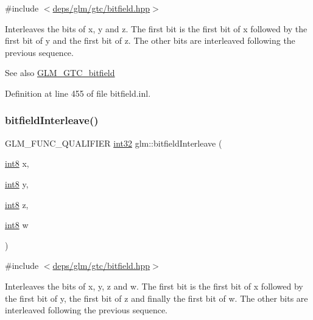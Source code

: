 {\ttfamily \#include $<$\hyperlink{bitfield_8hpp}{deps/glm/gtc/bitfield.\+hpp}$>$}

Interleaves the bits of x, y and z. The first bit is the first bit of x followed by the first bit of y and the first bit of z. The other bits are interleaved following the previous sequence.

\begin{DoxySeeAlso}{See also}
\hyperlink{group__gtc__bitfield}{G\+L\+M\+\_\+\+G\+T\+C\+\_\+bitfield} 
\end{DoxySeeAlso}


Definition at line 455 of file bitfield.\+inl.

\mbox{\label{group__gtc__bitfield_ga7da84ecc2b3a46c9c08a9f40012359cf}} 
\subsubsection{\texorpdfstring{bitfield\+Interleave()}{bitfieldInterleave()}\hspace{0.1cm}{\footnotesize\ttfamily [13/16]}}
{\footnotesize\ttfamily G\+L\+M\+\_\+\+F\+U\+N\+C\+\_\+\+Q\+U\+A\+L\+I\+F\+I\+ER \hyperlink{group__gtc__type__precision_ga632d8b25f6b61659f39ea4321fab92a4}{int32} glm\+::bitfield\+Interleave (\begin{DoxyParamCaption}\item[{\hyperlink{group__gtc__type__precision_ga96254f9c1c4506fc8eb5cf3301ce8565}{int8}}]{x,  }\item[{\hyperlink{group__gtc__type__precision_ga96254f9c1c4506fc8eb5cf3301ce8565}{int8}}]{y,  }\item[{\hyperlink{group__gtc__type__precision_ga96254f9c1c4506fc8eb5cf3301ce8565}{int8}}]{z,  }\item[{\hyperlink{group__gtc__type__precision_ga96254f9c1c4506fc8eb5cf3301ce8565}{int8}}]{w }\end{DoxyParamCaption})}



{\ttfamily \#include $<$\hyperlink{bitfield_8hpp}{deps/glm/gtc/bitfield.\+hpp}$>$}

Interleaves the bits of x, y, z and w. The first bit is the first bit of x followed by the first bit of y, the first bit of z and finally the first bit of w. The other bits are interleaved following the previous sequence.


